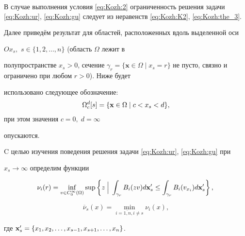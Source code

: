 \smallskip



\begin{remark}[3]\label{mark_4}

В случае выполнения условия \eqref{eq:Kozh:2} ограниченность решения задачи \eqref{eq:Kozh:ur}, \eqref{eq:Kozh:gu} следует из неравенств \eqref{eq:Kozh:K2}, \eqref{eq:Kozh:the_3}.

\end{remark}



\smallskip



Далее приведём результат для  областей, расположенных вдоль выделенной оси

$Ox_s,$ $s\in\{1, 2,\ldots,n\}$ (область $\Omega$ лежит в

полупространстве $x_s>0$, сечение $\gamma_r=\{\textbf{x}\in\Omega

\;|\; x_s=r\}$ не пусто, связно и ограничено при любом $r>0$). Ниже будет

использовано следующее обозначение: $$\Omega_{c}^{d}[s]=\{{\bf

x}\in\Omega\;|\;c<x_s<d\},$$ при этом значения $c=0,\;d=\infty$

опускаются.



C целью изучения поведения решения задачи \eqref{eq:Kozh:ur}, \eqref{eq:Kozh:gu} при

$x_s \to  \infty$ определим функции

\begin{equation}\label{eq:Kozh:nu}

\nu_i (r)=\inf_{v\in C_0^{\infty}(\Omega)}\sup\left\{z\;\Big|\; \int_{\gamma_r}B_i(zv)d{\bf x}'_s\leq\int_{\gamma_r}B_i(v_{x_i})d{\bf x}'_s\right\},\; \end{equation}

$$\overline{\nu}_s(x)=\min\limits_{i=\overline{1,n},i\neq s}\nu_i(x),$$

где ${\bf x}'_s=\{x_1,x_2,\dots,x_{s-1},x_{s+1},\dots,x_n\}$.










